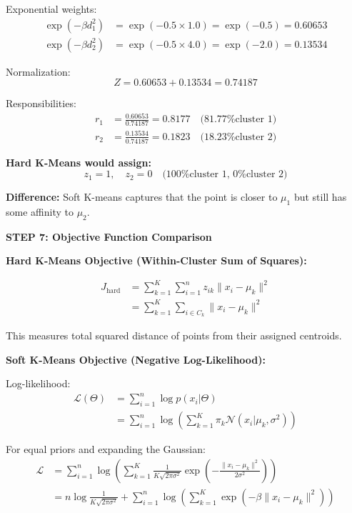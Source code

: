 \documentclass[12pt]{article}
\begin{document}
\begin{solution}
Exponential weights:
\begin{align*}
\exp(-\beta d_1^2) &= \exp(-0.5 \times 1.0) = \exp(-0.5) = 0.60653 \\
\exp(-\beta d_2^2) &= \exp(-0.5 \times 4.0) = \exp(-2.0) = 0.13534
\end{align*}

Normalization:
\[
Z = 0.60653 + 0.13534 = 0.74187
\]

Responsibilities:
\begin{align*}
r_1 &= \frac{0.60653}{0.74187} = 0.8177 \quad \text{(81.77\% cluster 1)} \\
r_2 &= \frac{0.13534}{0.74187} = 0.1823 \quad \text{(18.23\% cluster 2)}
\end{align*}

\textbf{Hard K-Means would assign:}
\[
z_1 = 1, \quad z_2 = 0 \quad \text{(100\% cluster 1, 0\% cluster 2)}
\]

\textbf{Difference:} Soft K-means captures that the point is closer to $\mu_1$ but still has some affinity to $\mu_2$.

\textbf{STEP 7: Objective Function Comparison}

\textbf{Hard K-Means Objective (Within-Cluster Sum of Squares):}

\begin{align*}
J_{\text{hard}} &= \sum_{k=1}^K \sum_{i=1}^n z_{ik} \|x_i - \mu_k\|^2 \\
&= \sum_{k=1}^K \sum_{i \in C_k} \|x_i - \mu_k\|^2
\end{align*}

This measures total squared distance of points from their assigned centroids.

\textbf{Soft K-Means Objective (Negative Log-Likelihood):}

Log-likelihood:
\begin{align*}
\mathcal{L}(\Theta) &= \sum_{i=1}^n \log p(x_i | \Theta) \\
&= \sum_{i=1}^n \log \left( \sum_{k=1}^K \pi_k \mathcal{N}(x_i | \mu_k, \sigma^2) \right)
\end{align*}

For equal priors and expanding the Gaussian:
\begin{align*}
\mathcal{L} &= \sum_{i=1}^n \log \left( \sum_{k=1}^K \frac{1}{K\sqrt{2\pi\sigma^2}} \exp\left(-\frac{\|x_i - \mu_k\|^2}{2\sigma^2}\right) \right) \\
&= n\log\frac{1}{K\sqrt{2\pi\sigma^2}} + \sum_{i=1}^n \log \left( \sum_{k=1}^K \exp(-\beta\|x_i - \mu_k\|^2) \right)
\end{align*}


\end{solution}
\end{document}

